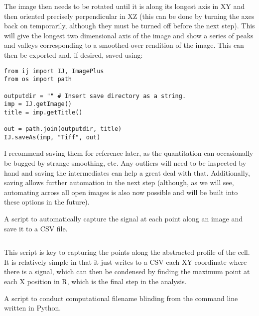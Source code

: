 The image then needs to be rotated until it is along its longest axis in XY and then oriented precisely perpendicular in XZ (this can be done by turning the axes back on temporarily, although they must be turned off before the next step). This will give the longest two dimensional axis of the image and show a series of peaks and valleys corresponding to a smoothed-over rendition of the image. This can then be exported and, if desired, saved using:

\begin{code}
\begin{verbatim}
from ij import IJ, ImagePlus
from os import path

outputdir = "" # Insert save directory as a string.
imp = IJ.getImage()
title = imp.getTitle()

out = path.join(outputdir, title)
IJ.saveAs(imp, "Tiff", out)
\end{verbatim}
\end{code}

I recommend saving them for reference later, as the quantitation can occasionally be bugged by strange smoothing, etc. Any outliers will need to be inspected by hand and saving the intermediates can help a great deal with that. Additionally, saving allows further automation in the next step (although, as we will see, automating across all open images is also now possible and will be built into these options in the future).

\begin{code}
\caption{A script to automatically capture the signal at each point along an image and save it to a CSV file.}
\label{surfaceplot}

\inputminted[breaklines,frame=single,fontsize=\small]{python}{source/autoSurfacePlotMeasure.py}

\end{code}

This script is key to capturing the points along the abstracted profile of the cell. It is relatively simple in that it just writes to a CSV each XY coordinate where there is a signal, which can then be condensed by finding the maximum point at each X position in R, which is the final step in the analysis.

\begin{code}
\caption{A script to conduct computational filename blinding from the command line written in Python.}
\label{blinder}

\inputminted[breaklines,frame=single,fontsize=\small]{r}{source/surface_plot_analysis.R}

\end{code}

